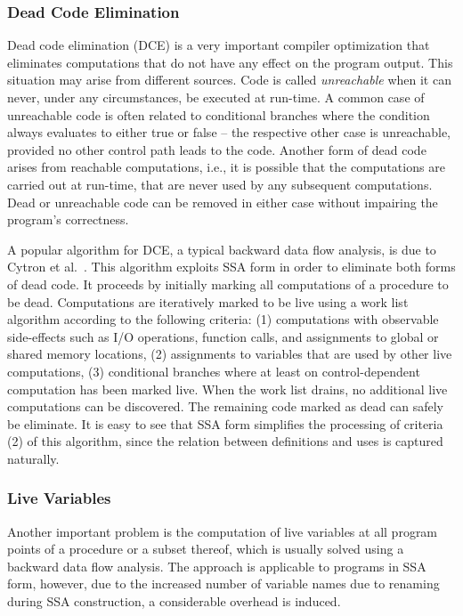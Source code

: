 \subsubsection*{Dead Code Elimination}

Dead code elimination (DCE) is a very important compiler optimization that
eliminates computations that do not have any effect on the program output. This
situation may arise from different sources. Code is called \emph{unreachable}
when it can never, under any circumstances, be executed at run-time. A common
case of unreachable code is often related to conditional branches where the
condition always evaluates to either true or false -- the respective other case
is unreachable, provided no other control path leads to the code.  Another form
of dead code arises from reachable computations, i.e., it is possible that the
computations are carried out at run-time, that are never used by any subsequent
computations. Dead or unreachable code can be removed in either case without
impairing the program's correctness.

A popular algorithm for DCE, a typical backward data flow analysis, is due to
Cytron et al.~\cite{novillo:bib:cytron.ea-91}. This algorithm exploits SSA form in
order to eliminate both forms of dead code. It proceeds by initially marking all
computations of a procedure to be dead. Computations are iteratively marked to
be live using a work list algorithm according to the following criteria: (1)
computations with observable side-effects such as I/O operations, function
calls, and assignments to global or shared memory locations, (2) assignments to
variables that are used by other live computations, (3) conditional branches
where at least on control-dependent computation has been marked live. When the
work list drains, no additional live computations can be discovered. The
remaining code marked as dead can safely be eliminate. It is easy to see that
SSA form simplifies the processing of criteria (2) of this algorithm, since the
relation between definitions and uses is captured naturally.

\subsubsection*{Live Variables}

Another important problem is the computation of live variables at all program
points of a procedure or a subset thereof, which is usually solved using a
backward data flow analysis. The approach is applicable to programs in SSA form,
however, due to the increased number of variable names due to renaming during
SSA construction, a considerable overhead is induced.

